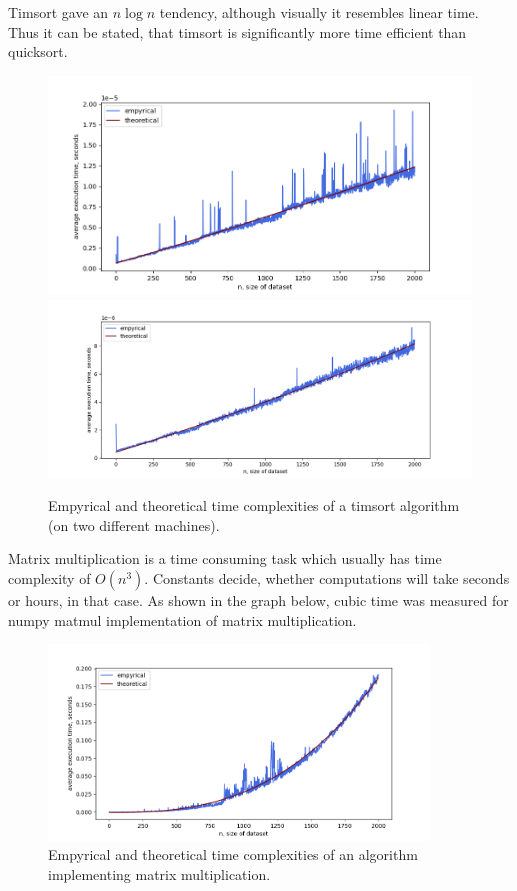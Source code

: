 \documentclass[12pt, a4paper]{article}
\begin{document}
Timsort gave an $n \log n$ tendency, although visually it resembles linear time. Thus it can be stated, that timsort is significantly more time efficient than quicksort.
\begin{figure}[!h]
\centering
\includegraphics[width=\textwidth]{timsort.png}
\includegraphics[width=\textwidth]{valeria/timsort.png}
\caption{Empyrical and theoretical time complexities of a timsort algorithm (on two different machines).}
\end{figure}

\newpage

Matrix multiplication is a time consuming task which usually has time complexity of $O(n^3)$. Constants decide, whether computations will take seconds or hours, in that case. As shown in the graph below, cubic time was measured for numpy matmul implementation of matrix multiplication.
\begin{figure}[!h]
\centering
\includegraphics[width=0.9\textwidth]{matmul.png}
\caption{Empyrical and theoretical time complexities of an algorithm implementing matrix multiplication.}
\end{figure}
\end{document}
